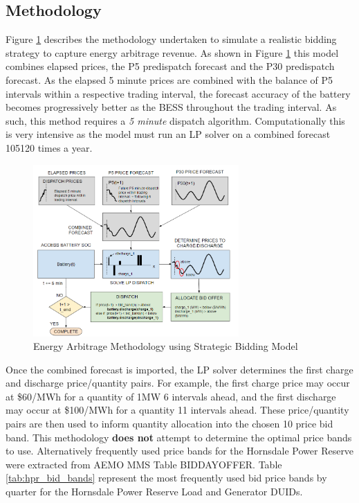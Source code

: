 \subsection{Methodology}
Figure \ref{fig:bidding_strategy_diagram} describes the methodology undertaken to simulate a realistic bidding strategy to capture energy arbitrage revenue. As shown in Figure \ref{fig:bidding_strategy_diagram} this model combines elapsed prices, the P5 predispatch forecast and the P30 predispatch forecast. As the elapsed 5 minute prices are combined with the balance of P5 intervals within a respective trading interval, the forecast accuracy of the battery becomes progressively better as the BESS throughout the trading interval. As such, this method requires a \textit{5 minute} dispatch algorithm. Computationally this is very intensive as the model must run an LP solver on a combined forecast 105120 times a year.
\begin{figure}[H]
    \centering
    \includegraphics[width=0.7\textwidth]{Pictures/Chapter5/bidding_strategy.png}
    \caption{Energy Arbitrage Methodology using Strategic Bidding Model}
    \label{fig:bidding_strategy_diagram}
\end{figure}
Once the combined forecast is imported, the LP solver determines the first charge and discharge price/quantity pairs. For example, the first charge price may occur at \$60/MWh for a quantity of 1MW 6 intervals ahead, and the first discharge may occur at \$100/MWh for a quantity 11 intervals ahead. These price/quantity pairs are then used to inform quantity allocation into the chosen 10 price bid band. This methodology \textbf{does not} attempt to determine the optimal price bands to use. Alternatively frequently used price bands for the Hornsdale Power Reserve were extracted from AEMO MMS Table BIDDAYOFFER. Table \ref{tab:hpr_bid_bands} represent the most frequently used bid price bands by quarter for the Hornsdale Power Reserve Load and Generator DUIDs.
